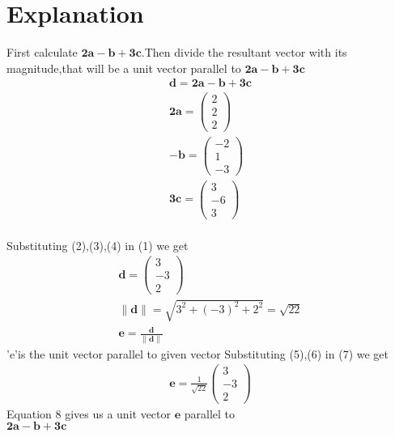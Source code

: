 \documentclass[journal,12pt,twocolumn]{IEEEtran}
\newcommand{\norm}[1]{\| #1 \|}
\begin{document}
\section{Explanation}
First calculate $\bm{2a}-\bm{b}+\bm{3c}$.Then divide the resultant vector with its magnitude,that will be a unit vector parallel to $\bm{2a}-\bm{b}+\bm{3c}$\\
\vspace{2mm}
\begin{align}
    \bm{d}=\bm{2a}-\bm{b}+\bm{3c}\\
    \bm{2a}=\begin{pmatrix}2\\2\\2\end{pmatrix}\\
    \bm{-b}=\begin{pmatrix}-2\\1\\-3\end{pmatrix}\\
    \bm{3c}=\begin{pmatrix}3\\-6\\3\end{pmatrix}
\end{align}
\vspace{2mm}\\
Substituting (2),(3),(4) in (1) we get\\
\begin{align}
    \bm{d}=\begin{pmatrix}3\\-3\\2\end{pmatrix}\\
    \norm{\bm{d}}=\sqrt{3^2+(-3)^2+2^2}=\sqrt{22}\\
    \bm{e}=\frac{\bm{d}}{\norm{\bm{d}}}
\end{align}
'e'is the unit vector parallel to given vector
Substituting (5),(6) in (7) we get
\begin{align}
    \boxed{\bm{e}=\frac{1}{\sqrt{22}}\begin{pmatrix}3\\-3\\2\end{pmatrix}}
\end{align}
Equation 8 gives us a unit vector $\bm{e}$ parallel to\\ $\bm{2a}-\bm{b}+\bm{3c}$  
\end{document}

